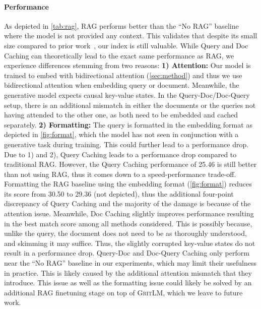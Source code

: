 \documentclass{article}
\newcommand{\model}{\textsc{GritLM}}
\begin{document}
\paragraph{Performance} As depicted in \autoref{tab:rag}, RAG performs better than the ``No RAG'' baseline where the model is not provided any context. This validates that despite its small size compared to prior work~\cite{lin2023radit}, our index is still valuable. While Query and Doc Caching can theoretically lead to the exact same performance as RAG, we experience differences stemming from two reasons: \textbf{1) Attention:} Our model is trained to embed with bidirectional attention (\autoref{sec:method}) and thus we use bidirectional attention when embedding query or document. Meanwhile, the generative model expects causal key-value states. In the Query-Doc/Doc-Query setup, there is an additional mismatch in either the documents or the queries not having attended to the other one, as both need to be embedded and cached separately. \textbf{2) Formatting:} The query is formatted in the embedding format as depicted in \autoref{fig:format}, which the model has not seen in conjunction with a generative task during training. This could further lead to a performance drop. Due to 1) and 2), Query Caching leads to a performance drop compared to traditional RAG. However, the Query Caching performance of 25.46 is still better than not using RAG, thus it comes down to a speed-performance trade-off. Formatting the RAG baseline using the embedding format (\autoref{fig:format}) reduces its score from 30.50 to 29.36 (not depicted), thus the additional four-point discrepancy of Query Caching and the majority of the damage is because of the attention issue. Meanwhile, Doc Caching slightly improves performance resulting in the best match score among all methods considered. This is possibly because, unlike the query, the document does not need to be as thoroughly understood, and skimming it may suffice. Thus, the slightly corrupted key-value states do not result in a performance drop. Query-Doc and Doc-Query Caching only perform near the ``No RAG'' baseline in our experiments, which may limit their usefulness in practice. This is likely caused by the additional attention mismatch that they introduce. This issue as well as the formatting issue could likely be solved by an additional RAG finetuning stage on top of \model{}, which we leave to future work.
\end{document}
